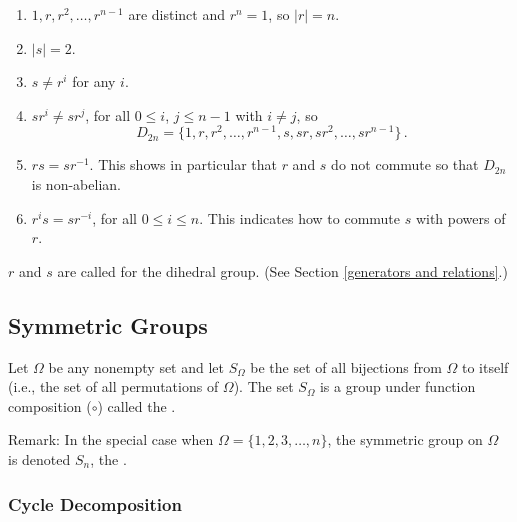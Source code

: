 \begin{theorem}
	$ $
	\begin{enumerate}
		\item $1, r, r^2, \dots, r^{n-1}$ are distinct and $r^n = 
		1$, so $|r| = n$.
		
		\item $|s| = 2$.
		
		\item $s \neq r^i$ for any $i$.
		
		\item $sr^i \neq sr^j$, for all $0 \leq i$, $j \leq n - 1$ 
		with $i \neq j$, so
		\[
			D_{2n} = \{ 1, r, r^2, \dots, r^{n-1}, s, sr, sr^2, 
			\dots, sr^{n-1} \}\,.
		\]
		
		\item $rs = sr^{-1}$. This shows in particular that $r$ and 
		$s$ do not commute so that $D_{2n}$ is non-abelian.
		
		\item $r^is = sr^{-i}$, for all $0 \leq i \leq n$. This 
		indicates how to commute $s$ with powers of $r$.
	\end{enumerate}
\end{theorem}

$r$ and $s$ are called  for the dihedral group. (See 
Section \ref{generators and relations}.)


\newpage

\subsection{Symmetric Groups}

\begin{definition}
	Let $\Omega$ be any nonempty set and let $S_\Omega$ be the set 
	of all bijections from $\Omega$ to itself (i.e., the set of all 
	permutations of $\Omega$). The set $S_\Omega$ is a group under 
	function composition ($\circ$) called the .
\end{definition}

Remark: In the special case when $\Omega = \{ 1, 2, 3, \dots, n 
\}$, the symmetric group on $\Omega$ is denoted $S_n$, the 
.

\subsubsection{Cycle Decomposition}

